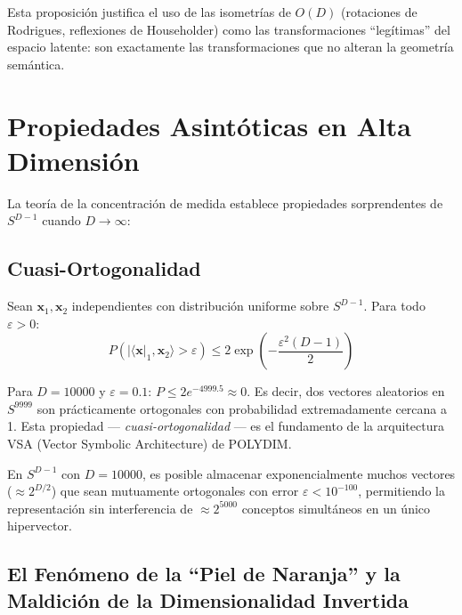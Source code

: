 Esta proposición justifica el uso de las isometrías de $O(D)$ (rotaciones de Rodrigues,
reflexiones de Householder) como las transformaciones ``legítimas'' del espacio
latente: son exactamente las transformaciones que no alteran la geometría semántica.

\section{Propiedades Asintóticas en Alta Dimensión}

La teoría de la concentración de medida establece propiedades sorprendentes
de $S^{D-1}$ cuando $D \to \infty$:

\subsection{Cuasi-Ortogonalidad}

\begin{theorem}[Concentración en $S^{D-1}$]

Sean $\mathbf{x}_1, \mathbf{x}_2$ independientes con distribución uniforme
sobre $S^{D-1}$. Para todo $\varepsilon > 0$:
\begin{equation}
P\left(|{\langle \mathbf{x}|_1, \mathbf{x}_2 \rangle} > \varepsilon\right) \le 2 \exp\left(-\frac{\varepsilon^2 (D-1)}{2}\right)

\end{equation}
\end{theorem}

Para $D = 10000$ y $\varepsilon = 0.1$: $P \le 2e^{-4999.5} \approx 0$. Es decir,
dos vectores aleatorios en $S^{9999}$ son prácticamente ortogonales con probabilidad
extremadamente cercana a 1. Esta propiedad --- \textit{cuasi-ortogonalidad} --- es
el fundamento de la arquitectura VSA (Vector Symbolic Architecture) de POLYDIM.

\begin{corollary}

En $S^{D-1}$ con $D = 10000$, es posible almacenar exponencialmente muchos
vectores ($\approx 2^{D/2}$) que sean mutuamente ortogonales con error
$\varepsilon < 10^{-100}$, permitiendo la representación sin interferencia de
$\approx 2^{5000}$ conceptos simultáneos en un único hipervector.
\end{corollary}

\subsection{El Fenómeno de la ``Piel de Naranja'' y la Maldición de la Dimensionalidad Invertida}

